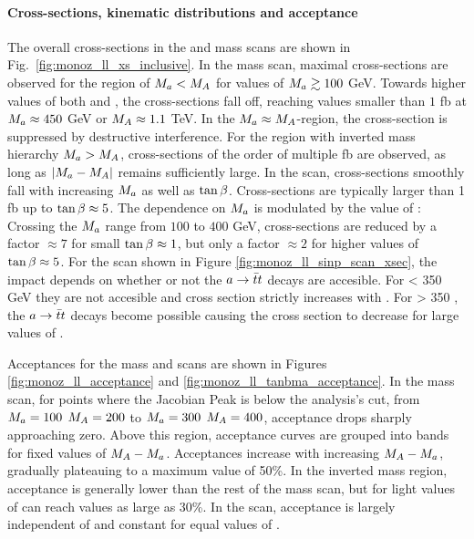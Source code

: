 \paragraph{Cross-sections, kinematic distributions and acceptance}
The overall cross-sections in the \tanb and mass scans are shown in Fig.~\ref{fig:monoz_ll_xs_inclusive}.
In the mass scan, maximal cross-sections are observed for the region of $M_{a} < M_{A}$ for values of $M_{a}\gtrsim100$ GeV. Towards higher values of both \ma and \mA, the cross-sections fall off, reaching values smaller than $1$ fb at $M_{a}\approx450$ GeV or $M_{A}\approx1.1$ TeV. In the $M_{a}\approx M_{A}$-region, the cross-section is suppressed by destructive interference. For the region with inverted mass hierarchy $M_{a}>M_{A}$, cross-sections of the order of multiple fb are observed, as long as $|M_{a}-M_{A}|$ remains sufficiently large.
In the \tanb scan, cross-sections smoothly fall with increasing $M_{a}$ as well as $\tan\beta$. Cross-sections are typically larger than 1 fb up to $\tan\beta\approx5$. The dependence on $M_{a}$ is modulated by the value of \tanb: Crossing the $M_{a}$ range from $100$ to $400$ GeV, cross-sections are reduced by a factor $\approx7$ for small $\tan\beta\approx1$, but only a factor $\approx2$ for higher values of $\tan\beta\approx5$.
For the \sinp scan shown in Figure \ref{fig:monoz_ll_sinp_scan_xsec}, the \sinp impact depends on whether or not the $a \rightarrow \bar{t}t$ decays are accesible.  
For \ma < 350 GeV they are not accesible and cross section strictly increases with \sinp.  For \ma > 350 \GeV, the $a \rightarrow \bar{t}t$ decays become possible causing the cross section to decrease for large values of \sinp.



Acceptances for the mass and \tanb scans are shown in Figures \ref{fig:monoz_ll_acceptance} and \ref{fig:monoz_ll_tanbma_acceptance}.  
In the mass scan, for points where the Jacobian Peak is below the analysis's \MET cut, from $M_{a} = 100$ $M_{A} = 200$ to $M_{a} = 300$ $M_{A} = 400$, 
acceptance drops sharply approaching zero.  Above this region, acceptance curves are grouped into bands for fixed values of $M_{A}-M_{a}$.  
Acceptances increase with increasing $M_{A}-M_{a}$, gradually plateauing to a maximum value of 50\%.  In the inverted mass region, 
acceptance is generally lower than the rest of the mass scan, but for light values of \ma can reach values as large as 30\%.
In the \tanb scan, acceptance is largely independent of \tanb and constant for equal values of \ma.

